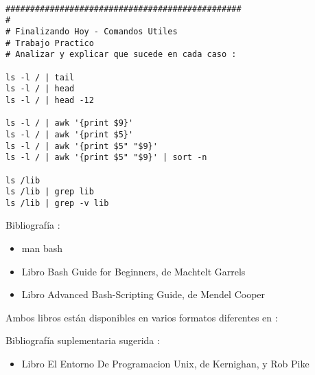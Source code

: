 \documentclass{beamer}
\begin{document}
\begin{Verbatim}

################################################
#
# Finalizando Hoy - Comandos Utiles
# Trabajo Practico 
# Analizar y explicar que sucede en cada caso :

ls -l / | tail 
ls -l / | head 
ls -l / | head -12

ls -l / | awk '{print $9}'
ls -l / | awk '{print $5}'
ls -l / | awk '{print $5" "$9}'
ls -l / | awk '{print $5" "$9}' | sort -n

ls /lib
ls /lib | grep lib
ls /lib | grep -v lib
\end{Verbatim}




\begin{frame}
Bibliografía : 
\begin{itemize}
\item man bash
\item Libro Bash Guide for Beginners, de Machtelt Garrels 
\item Libro Advanced Bash-Scripting Guide, de Mendel Cooper
\end{itemize}

Ambos libros están disponibles en varios formatos diferentes en :

Bibliografía suplementaria sugerida : 
\begin{itemize}
\item Libro El Entorno De Programacion Unix, de Kernighan, y Rob Pike
\end{itemize}

\end{frame}
\end{document}
